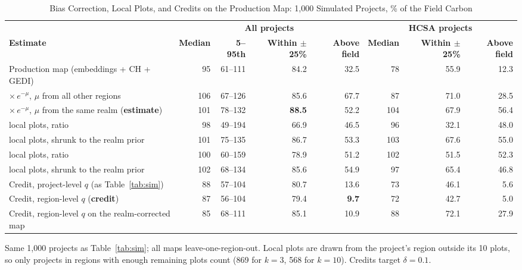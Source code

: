 \documentclass[conference,a4paper]{IEEEtran}
\begin{document}
\begin{table}[t]
\centering
\caption{Bias Correction, Local Plots, and Credits on the Production Map: 1{,}000 Simulated Projects, \% of the Field Carbon}
\label{tab:fixes}
\footnotesize
\setlength{\tabcolsep}{4pt}
\begin{tabular}{@{}l r r r r r r r@{}}
\toprule
 & \multicolumn{4}{c}{\textbf{All projects}} & \multicolumn{3}{c}{\textbf{HCSA projects}}\\
\textbf{Estimate} & \textbf{Median} & \textbf{5--95th} & \textbf{Within $\pm$25\%} & \textbf{Above field} & \textbf{Median} & \textbf{Within $\pm$25\%} & \textbf{Above field}\\
\midrule
Production map (embeddings + CH + GEDI) & 95 & 61--111 & 84.2 & 32.5 & 78 & 55.9 & 12.3\\
\quad $\times\,e^{-\mu}$, $\mu$ from all other regions & 106 & 67--126 & 85.6 & 67.7 & 87 & 71.0 & 28.5\\
\quad $\times\,e^{-\mu}$, $\mu$ from the same realm (\textbf{estimate}) & 101 & 78--132 & \textbf{88.5} & 52.2 & 104 & 67.9 & 56.4\\
\quad 3 local plots, ratio & 98 & 49--194 & 66.9 & 46.5 & 96 & 32.1 & 48.0\\
\quad 3 local plots, shrunk to the realm prior & 101 & 75--135 & 86.7 & 53.3 & 103 & 67.6 & 55.0\\
\quad 10 local plots, ratio & 100 & 60--159 & 78.9 & 51.2 & 102 & 51.5 & 52.3\\
\quad 10 local plots, shrunk to the realm prior & 102 & 68--134 & 85.6 & 54.9 & 97 & 65.4 & 46.8\\
\midrule
Credit, project-level $q$ (as Table~\ref{tab:sim}) & 88 & 57--104 & 80.7 & 13.6 & 73 & 46.1 & 5.6\\
Credit, region-level $q$ (\textbf{credit}) & 87 & 56--104 & 79.4 & \textbf{9.7} & 72 & 42.7 & 5.0\\
Credit, region-level $q$ on the realm-corrected map & 85 & 68--111 & 85.1 & 10.9 & 88 & 72.1 & 27.9\\
\bottomrule
\end{tabular}

\vspace{2pt}
{\scriptsize Same 1{,}000 projects as Table~\ref{tab:sim}; all maps leave-one-region-out. Local plots are drawn from the project's region outside its 10 plots, so only projects in regions with enough remaining plots count (869 for $k=3$, 568 for $k=10$). Credits target $\delta=0.1$.\par}
\end{table}
\end{document}
